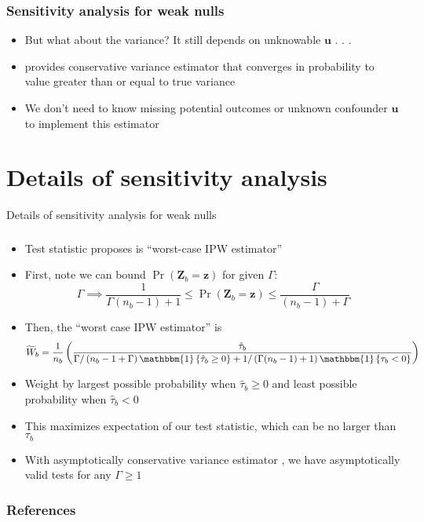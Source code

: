 \documentclass[table, xcolor = {dvipsnames}, 9pt]{beamer}
\theoremstyle{plain}
\begin{document}
\begin{frame}[t]
\frametitle{Sensitivity analysis for weak nulls} 
\vfill
\begin{itemize} \vfill
\item But what about the variance? It still depends on unknowable $\bm{u}$ . . .  \vfill
\item \citet{fogarty2018} provides conservative variance estimator that converges in probability to value greater than or equal to true variance \vfill
\item We don't need to know missing potential outcomes or unknown confounder $\bm{u}$ to implement this estimator \vfill
\end{itemize}  
\vfill
\end{frame}
\section{Details of sensitivity analysis}
\begin{frame}[t]{Details of sensitivity analysis for weak nulls}
\frametitle{} 
\vfill
\begin{itemize} \vfill
\item Test statistic \citet{fogarty2020} proposes is ``worst-case IPW estimator'' \vfill
\item First, note we can bound $\Pr\left(\bm{Z}_b = \bm{z}\right)$ for given $\Gamma$:
\begin{equation*}
\Gamma \implies \dfrac{1}{\Gamma(n_b - 1) + 1} \leq \Pr(\bm{Z}_b = \bm{z}) \leq \dfrac{\Gamma}{(n_b - 1) + \Gamma}
\end{equation*}
\small
\item Then, the ``worst case IPW estimator'' is \vfill
\begin{equation}
\widetilde{W}_b = \dfrac{1}{n_b}\left(\dfrac{\hat{\tau}_b}{\Gamma / \left(n_b - 1 + \Gamma\right) \mathbbm{1}\left\{\hat{\tau}_b \geq 0\right\} + 1 / \left(\Gamma(n_b - 1) + 1\right)\mathbbm{1}\left\{\tau_b < 0\right\}}\right)
\end{equation} \vfill
\normalsize
\item Weight by largest possible probability when $\hat{\tau}_b \geq 0$ and least possible probability when $\hat{\tau}_b < 0$ \vfill
\item This maximizes expectation of our test statistic, which can be no larger than $\tau_b$ \vfill
\item With asymptotically conservative variance estimator \citep{fogarty2018,fogarty2020}, we have asymptotically valid tests for any $\Gamma \geq 1$ \vfill
\end{itemize}  
\vfill
\end{frame}
\begin{frame}[allowframebreaks]
\frametitle{References} 
\scriptsize

\end{frame}
\end{document}
